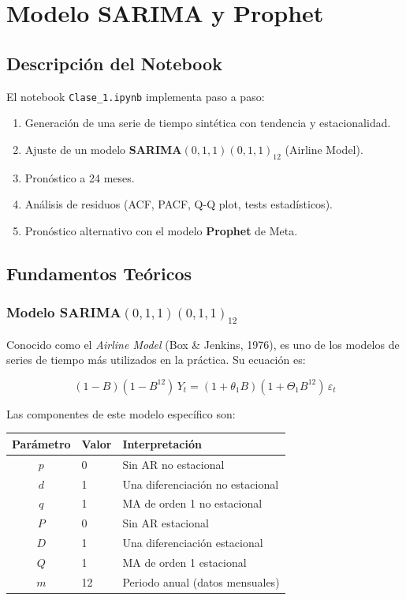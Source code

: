 \documentclass[12pt, a4paper]{article}
\begin{document}
\section{Modelo SARIMA y Prophet}

\subsection{Descripción del Notebook}

El notebook \texttt{Clase\_1.ipynb} implementa paso a paso:
\begin{enumerate}[noitemsep]
  \item Generación de una serie de tiempo sintética con tendencia y estacionalidad.
  \item Ajuste de un modelo \textbf{SARIMA}$(0,1,1)(0,1,1)_{12}$ (Airline Model).
  \item Pronóstico a 24 meses.
  \item Análisis de residuos (ACF, PACF, Q-Q plot, tests estadísticos).
  \item Pronóstico alternativo con el modelo \textbf{Prophet} de Meta.
\end{enumerate}

\subsection{Fundamentos Teóricos}

\subsubsection{Modelo SARIMA$(0,1,1)(0,1,1)_{12}$}

Conocido como el \textit{Airline Model} (Box \& Jenkins, 1976), es uno de los
modelos de series de tiempo más utilizados en la práctica. Su ecuación es:

\[
  (1-B)(1-B^{12})\,Y_t
  = (1 + \theta_1 B)(1 + \Theta_1 B^{12})\,\varepsilon_t
\]

Las componentes de este modelo específico son:

\begin{center}
\renewcommand{\arraystretch}{1.4}
\begin{tabular}{cll}
  \toprule
  \textbf{Parámetro} & \textbf{Valor} & \textbf{Interpretación} \\
  \midrule
  $p$ & 0 & Sin AR no estacional \\
  $d$ & 1 & Una diferenciación no estacional \\
  $q$ & 1 & MA de orden 1 no estacional \\
  $P$ & 0 & Sin AR estacional \\
  $D$ & 1 & Una diferenciación estacional \\
  $Q$ & 1 & MA de orden 1 estacional \\
  $m$ & 12 & Periodo anual (datos mensuales) \\
  \bottomrule
\end{tabular}
\end{center}
\end{document}
